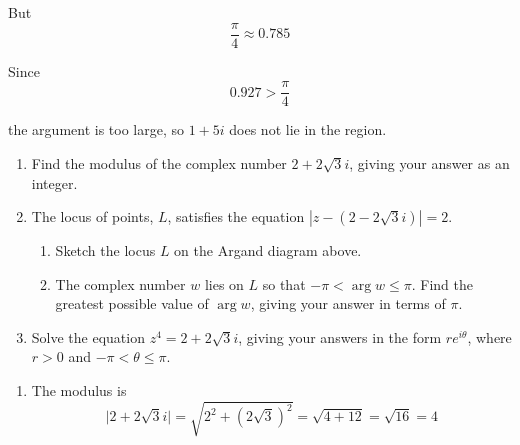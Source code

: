 \documentclass[leqno]{article}
\begin{document}
\begin{enumerate}[
  label=\textbf{\arabic*.},
  leftmargin=*,
  topsep=0pt,
  partopsep=0pt,
  parsep=0pt
]
\begin{djsSolution}
\begin{enumerate}[label=\textbf{(\alph*)}]
\begin{enumerate}[label=(\roman*)]
    But
    \[
    \frac{\pi}{4}\approx 0.785
    \]

    Since
    \[
    0.927>\frac{\pi}{4}
    \]

    the argument is too large, so $1+5i$ does not lie in the region.
  \end{enumerate}
\end{enumerate}
\end{djsSolution}


\newpage

\questionitem

\begin{figure}[H]
    \centering
{}
\end{figure}


\begin{enumerate}[label=\textbf{(\alph*)}]
  \item Find the modulus of the complex number $2+2\sqrt{3}i$, giving your answer as an integer.  \\
  \item The locus of points, $L$, satisfies the equation $|z-(2-2\sqrt{3}i)|=2$.
  \begin{enumerate}[label=(\roman*)]
    \item Sketch the locus $L$ on the Argand diagram above. 
    \item The complex number $w$ lies on $L$ so that $-\pi<\arg w\leq \pi$. Find the greatest possible value of $\arg w$, giving your answer in terms of $\pi$.  \\
  \end{enumerate}
  \item Solve the equation $z^4=2+2\sqrt{3}i$, giving your answers in the form $re^{i\theta}$, where $r>0$ and $-\pi<\theta\leq \pi$.  \\
\end{enumerate}

\vspace*{10pt}

\begin{djsSolution}
\begin{enumerate}[label=\textbf{(\alph*)}]
  \item The modulus is
  \[
  \lvert 2+2\sqrt{3}i\rvert=\sqrt{2^2+(2\sqrt{3})^2}
  =\sqrt{4+12}
  =\sqrt{16}
  =4
  \]


\end{enumerate}
\end{djsSolution}
\end{enumerate}
\end{document}
